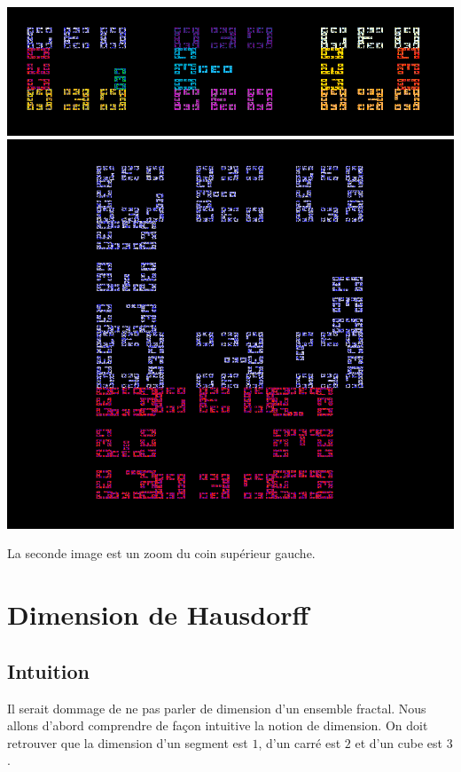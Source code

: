 \documentclass[11pt,class=report,crop=false]{standalone}
\begin{document}
\begin{center}
 \includegraphics[scale=.5]{images/IFS-geo1.png} \\[2mm]

 \includegraphics[scale=.2]{images/IFS-geo2.png} 
\end{center}
La seconde image est un zoom du coin supérieur gauche.


\section{Dimension de Hausdorff}


\subsection{Intuition}

Il serait dommage de ne pas parler de dimension d'un ensemble fractal.
Nous allons d'abord comprendre de façon intuitive la notion de dimension.
On doit retrouver que la dimension d'un segment est $1$,
d'un carré est $2$ et d'un cube est $3$.
\end{document}
